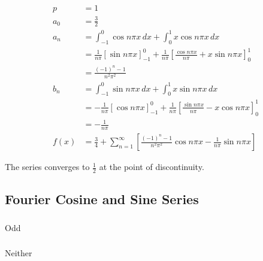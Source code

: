 \documentclass{article}
\begin{document}
\begin{align*}
  p    & = 1                                                                                                                         \\
  a_0  & = \frac{3}{2}                                                                                                               \\
  a_n  & = \int_{-1}^0 \cos n \pi x \,d x + \int_0^1 x \cos n \pi x \,d x                                                            \\
       & = \frac{1}{n \pi} [\sin n \pi x]_{-1}^0 + \frac{1}{n \pi} \left[ \frac{\cos n \pi x}{n \pi} + x \sin n \pi x \right]_0^1    \\
       & = \frac{(-1)^n - 1}{n^2 \pi^2}                                                                                              \\
  b_n  & = \int_{-1}^0 \sin n \pi x \,d x + \int_0^1 x \sin n \pi x \,d x                                                            \\
       & = -\frac{1}{n \pi} [\cos n \pi x]_{-1}^0 + \frac{1}{n \pi} \left[ \frac{\sin n \pi x}{n \pi} - x \cos n \pi x \right]_0^1   \\
       & = -\frac{1}{n \pi}                                                                                                          \\
  f(x) & = \frac{3}{4} + \sum_{n = 1}^\infty \left[ \frac{(-1)^n - 1}{n^2 \pi^2} \cos n \pi x - \frac{1}{n \pi} \sin n \pi x \right]
\end{align*}

The series converges to $\frac{1}{2}$ at the point of discontinuity.

\subsection{Fourier Cosine and Sine Series}

\subsubsection{}

Odd

\setcounter{subsubsection}{2}
\subsubsection{}

Neither
\end{document}
